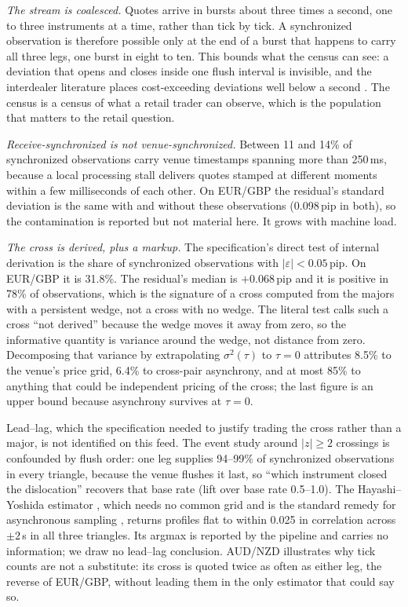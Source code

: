 \documentclass[11pt]{article}
\begin{document}
\emph{The stream is coalesced.} Quotes arrive in bursts about three
times a second, one to three instruments at a time, rather than tick by
tick. A synchronized observation is therefore possible only at the end
of a burst that happens to carry all three legs, one burst in eight
to ten. This bounds what the census can see: a deviation that opens and
closes inside one flush interval is invisible, and the interdealer
literature places cost-exceeding deviations well below a second
\cite{fenn2009,chaboud2014}. The census is a census of what a retail
trader can observe, which is the population that matters to the
retail question.

\emph{Receive-synchronized is not venue-synchronized.} Between 11 and
14\% of synchronized observations carry venue timestamps spanning more
than 250\,ms, because a local processing stall delivers quotes stamped
at different moments within a few milliseconds of each other. On
EUR/GBP the residual's standard deviation is the same with and without
these observations (0.098\,pip in both), so the contamination is
reported but not material here. It grows with machine load.

\emph{The cross is derived, plus a markup.} The specification's direct
test of internal derivation is the share of synchronized observations
with $|\varepsilon| < 0.05$\,pip. On EUR/GBP it is 31.8\%. The
residual's median is $+0.068$\,pip and it is positive in 78\% of
observations, which is the signature of a cross computed from the
majors with a persistent wedge, not a cross with no wedge. The
literal test calls such a cross ``not derived'' because the wedge
moves it away from zero, so the informative quantity is variance
around the wedge, not distance from zero. Decomposing that variance
by extrapolating $\sigma^2(\tau)$ to $\tau = 0$ attributes 8.5\% to the
venue's price grid, 6.4\% to cross-pair asynchrony, and at most 85\% to
anything that could be independent pricing of the cross; the last
figure is an upper bound because asynchrony survives at $\tau = 0$.

Lead--lag, which the specification needed to justify trading the cross
rather than a major, is not identified on this feed. The event study
around $|z| \ge 2$ crossings is confounded by flush order: one leg
supplies 94--99\% of synchronized observations in every triangle,
because the venue flushes it last, so ``which instrument closed the
dislocation'' recovers that base rate (lift over base rate 0.5--1.0).
The Hayashi--Yoshida estimator \cite{hayashi2005}, which needs no
common grid and is the standard remedy for asynchronous sampling
\cite{epps1979}, returns profiles flat to within 0.025 in correlation across
$\pm 2$\,s in all three triangles. Its argmax is reported by the pipeline and
carries no information; we draw no lead--lag conclusion. AUD/NZD
illustrates why tick counts are not a substitute: its cross is quoted
twice as often as either leg, the reverse of EUR/GBP, without leading
them in the only estimator that could say so.
\end{document}
